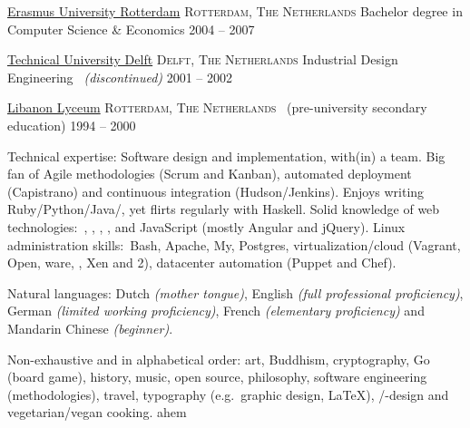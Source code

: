 \documentclass[10pt,a4paper]{article}
\begin{document}
\spacedhrule{-0.2em}{-0.4em}


\headedsection
  {\href{http://www.eur.nl/english}{Erasmus University Rotterdam}}
  {\textsc{Rotterdam, The Netherlands}} {%
  \headedsubsection
    {Bachelor degree in Computer Science \& Economics}
    {2004 -- 2007}
    {}
}

\headedsection
  {\href{http://www.tudelft.nl/en}{Technical University Delft}}
  {\textsc{Delft, The Netherlands}} {%
  \headedsubsection
    {Industrial Design Engineering \textnormal{\textit{~(discontinued)}}}
    {2001 -- 2002} {}
}

\headedsection
  {\href{http://www.libanonlyceum.nl}{Libanon Lyceum}}
  {\textsc{Rotterdam, The Netherlands}} {%
  \headedsubsection
    { \textnormal{~(pre-university secondary education)}}
    {1994 -- 2000} {}
}


\spacedhrule{0.5em}{-0.4em}


\inlineheadsection  %
  {Technical expertise:}
  {Software design and implementation, with(in) a team.  Big fan of Agile methodologies (Scrum and Kanban), automated deployment (Capistrano) and continuous integration (Hudson/Jenkins).  Enjoys writing Ruby/\nsp Python/\nsp Java/\nsp \CPP, yet flirts regularly with Haskell.  Solid knowledge of web technologies:\ , , , ,  and JavaScript (mostly Angular and jQuery).  Linux administration skills:\ Bash, Apache, My, Postgres, virtualization/cloud (Vagrant, Open, ware, , Xen and 2), datacenter automation (Puppet and Chef).}

\vspace{0.5em}
\inlineheadsection
  {Natural languages:}
  {Dutch \emph{(mother tongue)}, English \emph{(full professional proficiency)}, German \emph{(limited working proficiency)}, French \emph{(elementary proficiency)} and Mandarin Chinese \emph{(beginner)}.}


\spacedhrule{1.6em}{-0.4em}


\inlineheadsection
  {Non-exhaustive and in alphabetical order:}
  {art, Buddhism, cryptography, Go (board game), history, music, open source, philosophy, software engineering (methodologies), travel, typography (e.g.\ graphic design, \LaTeX), /-design and vegetarian/vegan cooking.}
ahem
\end{document}
